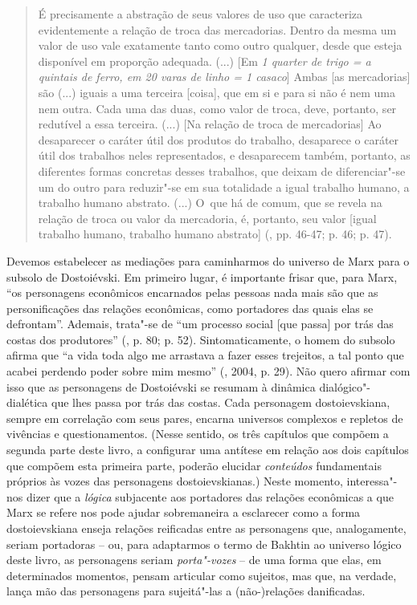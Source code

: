 {\begin{quote}
É precisamente a abstração de seus valores de uso que caracteriza
evidentemente a relação de troca das mercadorias. Dentro da mesma um
valor de uso vale exatamente tanto como outro qualquer, desde que esteja
disponível em proporção adequada. (...) {[}Em \emph{1 quarter de trigo =
a quintais de ferro, em 20 varas de linho = 1 casaco}{]} Ambas {[}as
mercadorias{]} são (...) iguais a uma terceira {[}coisa{]}, que em si e
para si não é nem uma nem outra. Cada uma das duas, como valor de troca,
deve, portanto, ser redutível a essa terceira. (...) {[}Na relação de
troca de mercadorias{]} Ao desaparecer o caráter útil dos produtos do
trabalho, desaparece o caráter útil dos trabalhos neles representados, e
desaparecem também, portanto, as diferentes formas concretas desses
trabalhos, que deixam de diferenciar"-se um do outro para reduzir"-se em
sua totalidade a igual trabalho humano, a trabalho humano abstrato.
(...) O~que há de comum, que se revela na relação de troca ou valor da
mercadoria, é, portanto, seu valor {[}igual trabalho humano, trabalho
humano abstrato{]} (, pp. 46-47; p. 46; p. 47).
\end{quote}

Devemos estabelecer as mediações para caminharmos do universo de Marx
para o subsolo de Dostoiévski. Em primeiro lugar, é importante frisar
que, para Marx, ``os personagens econômicos encarnados pelas pessoas
nada mais são que as personificações das relações econômicas, como
portadores das quais elas se defrontam''. Ademais, trata"-se de ``um
processo social {[}que passa{]} por trás das costas dos produtores''
(, p. 80; p. 52). Sintomaticamente, o homem do subsolo afirma que
``a vida toda algo me arrastava a fazer esses trejeitos, a tal ponto que
acabei perdendo poder sobre mim mesmo'' (, 2004, p. 29). Não
quero afirmar com isso que as personagens de Dostoiévski se resumam à
dinâmica dialógico"-dialética que lhes passa por trás das costas. Cada
personagem dostoievskiana, sempre em correlação com seus pares, encarna
universos complexos e repletos de vivências e questionamentos. (Nesse
sentido, os três capítulos que compõem a segunda parte deste livro, a
configurar uma antítese em relação aos dois capítulos que compõem esta
primeira parte, poderão elucidar \emph{conteúdos} fundamentais próprios
às vozes das personagens dostoievskianas.) Neste momento, interessa"-nos
dizer que a \emph{lógica} subjacente aos portadores das relações
econômicas a que Marx se refere nos pode ajudar sobremaneira a
esclarecer como a forma dostoievskiana enseja relações reificadas entre
as personagens que, analogamente, seriam portadoras -- ou, para
adaptarmos o termo de Bakhtin ao universo lógico deste livro, as
personagens seriam \emph{porta"-vozes} -- de uma forma que elas, em
determinados momentos, pensam articular como sujeitos, mas que, na
verdade, lança mão das personagens para sujeitá"-las a (não-)relações
danificadas.

}
